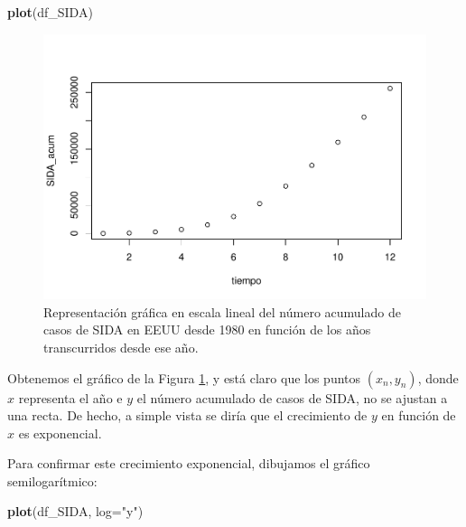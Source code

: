 \documentclass[
]{book}
\newenvironment{Shaded}{\begin{snugshade}}{\end{snugshade}}
\newcommand{\DataTypeTok}[1]{\textcolor[rgb]{0.13,0.29,0.53}{#1}}
\newcommand{\KeywordTok}[1]{\textcolor[rgb]{0.13,0.29,0.53}{\textbf{#1}}}
\newcommand{\NormalTok}[1]{#1}
\newcommand{\StringTok}[1]{\textcolor[rgb]{0.31,0.60,0.02}{#1}}
\theoremstyle{definition}
\theoremstyle{definition}
\theoremstyle{definition}
\theoremstyle{remark}
\begin{document}
\begin{Shaded}
\begin{Highlighting}[]
\KeywordTok{plot}\NormalTok{(df\_SIDA)}
\end{Highlighting}
\end{Shaded}

\begin{figure}

{\centering \includegraphics[width=0.9\linewidth]{03chap02_Un_aperitivo_files/figure-latex/F307a-1} 

}

\caption{Representación gráfica en escala lineal  del número acumulado de casos de SIDA en EEUU desde 1980 en función de los años transcurridos desde ese año.}\label{fig:F307a}
\end{figure}

Obtenemos el gráfico de la Figura \ref{fig:F307a}, y está claro que los puntos \((x_n,y_n)\), donde \(x\) representa el año e \(y\) el número acumulado de casos de SIDA, no se ajustan a una recta. De hecho, a simple vista se diría que el crecimiento de \(y\) en función de \(x\) es exponencial.

Para confirmar este crecimiento exponencial, dibujamos el gráfico semilogarítmico:

\begin{Shaded}
\begin{Highlighting}[]
\KeywordTok{plot}\NormalTok{(df\_SIDA, }\DataTypeTok{log=}\StringTok{"y"}\NormalTok{)}
\end{Highlighting}
\end{Shaded}
\end{document}
